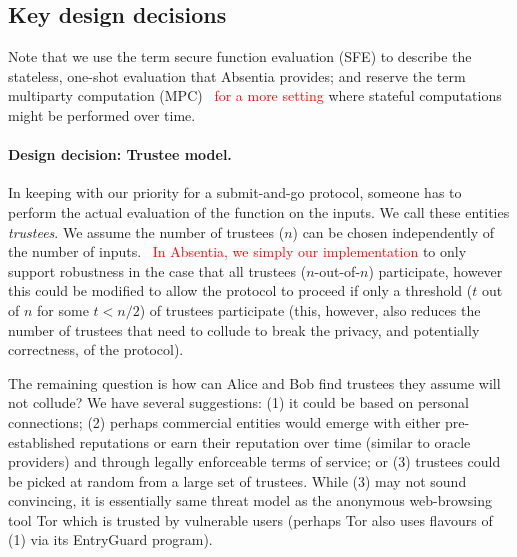  
\subsection{Key design decisions}

Note that we use the term secure function evaluation (SFE) to describe the stateless, one-shot evaluation that Absentia provides; and reserve the term multiparty computation (MPC) ~\textcolor{red}{for a more setting} where stateful computations might be performed over time.

\paragraph{Design decision: Trustee model.} In keeping with our priority for a submit-and-go protocol, someone has to perform the actual evaluation of the function on the inputs. We call these entities \emph{trustees}. We assume the number of trustees ($n$) can be chosen independently of the number of inputs. ~\textcolor{red}{In Absentia, we simply our implementation} to only support robustness in the case that all trustees ($n$-out-of-$n$) participate, however this could be modified to allow the protocol to proceed if only a threshold ($t$ out of $n$ for some $t<n/2$) of trustees participate (this, however, also reduces the number of trustees that need to collude to break the privacy, and potentially correctness, of the protocol).  

The remaining question is how can Alice and Bob find trustees they assume will not collude? We have several suggestions: (1) it could be based on personal connections; (2) perhaps commercial entities would emerge with either pre-established reputations or earn their reputation over time (similar to oracle providers) and through legally enforceable terms of service; or (3) trustees could be picked at random from a large set of trustees. While (3) may not sound convincing, it is essentially same threat model as the anonymous web-browsing tool Tor which is trusted by vulnerable users (perhaps Tor also uses flavours of (1) via its EntryGuard program). 

